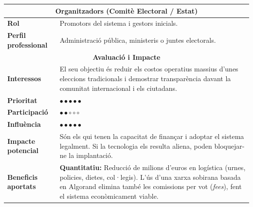 \begin{table}[H]
\centering
\renewcommand{\arraystretch}{1.5}
\begin{tabularx}{\textwidth}{|l|X|}
\hline
\multicolumn{2}{|c|}{\textbf{Organitzadors (Comitè Electoral / Estat)}} \\ \hline
\textbf{Rol} & Promotors del sistema i gestors inicials. \\ \hline
\textbf{Perfil professional} & Administració pública, ministeris o juntes electorals. \\ \hline
\multicolumn{2}{|c|}{\textbf{Avaluació i Impacte}} \\ \hline
\textbf{Interessos} & El seu objectiu és reduir els costos operatius massius d'unes eleccions tradicionals i demostrar transparència davant la comunitat internacional i els ciutadans. \\ \hline
\textbf{Prioritat} & \(\bullet \bullet \bullet \bullet \bullet\) \\ \hline
\textbf{Participació} & \(\bullet \bullet \circ \circ \circ\) \\ \hline
\textbf{Influència} & \(\bullet \bullet \bullet \bullet \bullet\) \\ \hline
\textbf{Impacte potencial} & Són els qui tenen la capacitat de finançar i adoptar el sistema legalment. Si la tecnologia els resulta aliena, poden bloquejar-ne la implantació. \\ \hline
\textbf{Beneficis aportats} & \textbf{Quantitatiu:} Reducció de milions d'euros en logística (urnes, policies, dietes, col·legis). L'ús d'una xarxa sobirana basada en Algorand elimina també les comissions per vot (\textit{fees}), fent el sistema econòmicament viable. \\ \hline
\end{tabularx}
\end{table}

\vspace{0.5cm}

